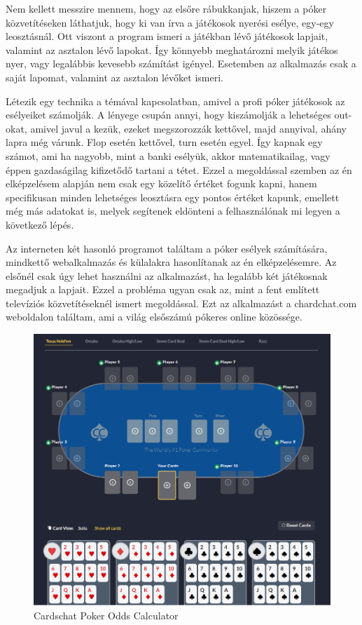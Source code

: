 Nem kellett messzire mennem, hogy az elsőre rábukkanjak, hiszem a póker közvetítéseken láthatjuk, hogy ki van írva a játékosok nyerési esélye, egy-egy leosztásnál. Ott viszont a program ismeri a játékban lévő játékosok lapjait, valamint az asztalon lévő lapokat. Így könnyebb meghatározni melyik játékos nyer, vagy legalábbis kevesebb számítást igényel. Esetemben az alkalmazás csak a saját lapomat, valamint az asztalon lévőket ismeri.

Létezik egy technika a témával kapcsolatban, amivel a profi póker játékosok az esélyeiket számolják. A lényege csupán annyi, hogy kiszámolják a lehetséges out-okat, amivel javul a kezük, ezeket megszorozzák kettővel, majd annyival, ahány lapra még várunk. Flop esetén kettővel, turn esetén egyel. Így kapnak egy számot, ami ha nagyobb, mint a banki esélyük, akkor matematikailag, vagy éppen gazdaságilag kifizetődő tartani a tétet. Ezzel a megoldással szemben az én elképzelésem alapján nem csak egy közelítő értéket fogunk kapni, hanem specifikusan minden lehetséges leosztásra egy pontos értéket kapunk, emellett még más adatokat is, melyek segítenek eldönteni a felhasználónak mi legyen a következő lépés.

Az interneten két hasonló programot találtam a póker esélyek számítására, mindkettő webalkalmazás és külalakra hasonlítanak az én elképzelésemre. Az elsőnél csak úgy lehet használni az alkalmazást, ha legalább két játékosnak megadjuk a lapjait. Ezzel a probléma ugyan csak az, mint a fent említett televíziós közvetítéseknél ismert megoldással. Ezt az alkalmazást a chardchat.com weboldalon találtam, ami a világ elsőszámú pókeres online közössége.

\begin{figure}[h!]
\centering
\includegraphics[scale=0.6]{images/cardschat.png}
\caption{Cardschat Poker Odds Calculator}
\label{fig:cardschat}
\end{figure}

